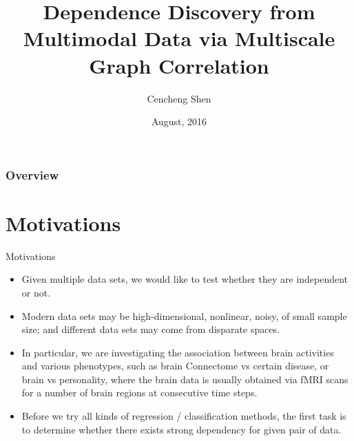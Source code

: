 \documentclass{beamer}
\title[JSM2016]{Dependence Discovery from Multimodal Data via Multiscale Graph Correlation}
\author{Cencheng Shen} %
\institute[Temple University] %
{
\textit{Joint Work with Joshua T. Vogelstein \& Mauro Maggioni \& Carey E. Priebe} \\
}
\date{August, 2016} %
\begin{document}

\begin{frame}
\titlepage %
\end{frame}

\begin{frame}
\frametitle{Overview} %
\tableofcontents %
\end{frame}

\section{Motivations}
\begin{frame}{Motivations}
\begin{itemize}[<+->]
\item Given multiple data sets, we would like to test whether they are independent or not.
\item Modern data sets may be high-dimensional, nonlinear, noisy, of small sample size; and different data sets may come from disparate spaces.
\item In particular, we are investigating the association between brain activities and various phenotypes, such as brain Connectome vs certain disease, or brain vs personality, where the brain data is usually obtained via fMRI scans for a number of brain regions at consecutive time steps.
\item Before we try all kinds of regression / classification methods, the first task is to determine whether there exists strong dependency for given pair of data.
\end{itemize}
\end{frame}
\end{document}
